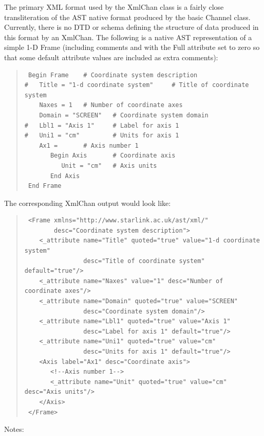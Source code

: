 \documentclass[twoside,11pt]{article}
\begin{document}
The primary XML format used by the XmlChan class is a fairly close
transliteration of the AST native format produced by the basic Channel
class. Currently, there is no DTD or schema defining the structure of data 
produced in this format by an XmlChan. The following is a native AST 
representation of a simple 1-D Frame (including comments and with the Full 
attribute set to zero so that some default attribute values are included 
as extra comments):

\begin{quote}
\small
\begin{verbatim}
 Begin Frame    # Coordinate system description
#   Title = "1-d coordinate system"     # Title of coordinate system
    Naxes = 1   # Number of coordinate axes
    Domain = "SCREEN"   # Coordinate system domain
#   Lbl1 = "Axis 1"     # Label for axis 1
#   Uni1 = "cm"         # Units for axis 1
    Ax1 =       # Axis number 1
       Begin Axis       # Coordinate axis
          Unit = "cm"   # Axis units
       End Axis
 End Frame
\end{verbatim}
\normalsize
\end{quote}

The corresponding XmlChan output would look like:

\begin{quote}
\small
\begin{verbatim}
 <Frame xmlns="http://www.starlink.ac.uk/ast/xml/" 
        desc="Coordinate system description">
    <_attribute name="Title" quoted="true" value="1-d coordinate system"
                desc="Title of coordinate system" default="true"/>
    <_attribute name="Naxes" value="1" desc="Number of coordinate axes"/>
    <_attribute name="Domain" quoted="true" value="SCREEN"
                desc="Coordinate system domain"/>
    <_attribute name="Lbl1" quoted="true" value="Axis 1" 
                desc="Label for axis 1" default="true"/>
    <_attribute name="Uni1" quoted="true" value="cm" 
                desc="Units for axis 1" default="true"/>
    <Axis label="Ax1" desc="Coordinate axis">
       <!--Axis number 1-->
       <_attribute name="Unit" quoted="true" value="cm" desc="Axis units"/>
    </Axis>
 </Frame>
\end{verbatim}
\normalsize
\end{quote}


Notes:
\end{document}
